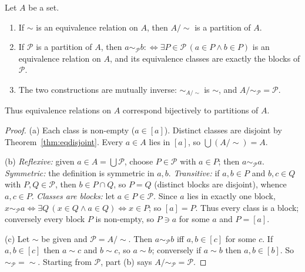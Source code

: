 \begin{theorem}\label{thm:equiv-partition}
	Let $A$ be a set.
	\begin{enumerate}[label=(\alph*)]
		\item If $\sim$ is an equivalence relation on $A$, then $A/{\sim}$ is a partition of $A$.
		\item If $\mathcal P$ is a partition of $A$, then $a\sim_{\mathcal P}b:\iff\exists P\in\mathcal P\,(a\in P\wedge b\in P)$ is an equivalence relation on $A$, and its equivalence classes are exactly the blocks of $\mathcal P$.
		\item The two constructions are mutually inverse: $\sim_{A/\sim}$ is $\sim$, and $A/{\sim_{\mathcal P}}=\mathcal P$.
	\end{enumerate}
	Thus equivalence relations on $A$ correspond bijectively to partitions of $A$.
\end{theorem}
\begin{proof}
	(a) Each class is non-empty ($a\in[a]$). Distinct classes are disjoint by Theorem~\ref{thm:eqdisjoint}. Every $a\in A$ lies in $[a]$, so $\bigcup(A/{\sim})=A$.
	
	(b) \emph{Reflexive:} given $a\in A=\bigcup\mathcal P$, choose $P\in\mathcal P$ with $a\in P$; then $a\sim_{\mathcal P}a$. \emph{Symmetric:} the definition is symmetric in $a,b$. \emph{Transitive:} if $a,b\in P$ and $b,c\in Q$ with $P,Q\in\mathcal P$, then $b\in P\cap Q$, so $P=Q$ (distinct blocks are disjoint), whence $a,c\in P$. \emph{Classes are blocks:} let $a\in P\in\mathcal P$. Since $a$ lies in exactly one block, $x\sim_{\mathcal P}a\iff\exists Q\,(x\in Q\wedge a\in Q)\iff x\in P$; so $[a]=P$. Thus every class is a block; conversely every block $P$ is non-empty, so $P\ni a$ for some $a$ and $P=[a]$.
	
	(c) Let $\sim$ be given and $\mathcal P=A/{\sim}$. Then $a\sim_{\mathcal P}b$ iff $a,b\in[c]$ for some $c$. If $a,b\in[c]$ then $a\sim c$ and $b\sim c$, so $a\sim b$; conversely if $a\sim b$ then $a,b\in[b]$. So $\sim_{\mathcal P}=\sim$. Starting from $\mathcal P$, part (b) says $A/{\sim_{\mathcal P}}=\mathcal P$.
\end{proof}

